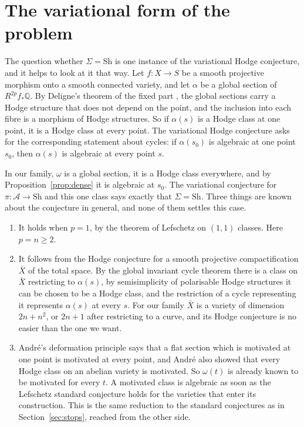 \documentclass[11pt]{amsart}
\theoremstyle{definition}
\theoremstyle{remark}
\newcommand{\QQ}{\mathbb{Q}}
\newcommand{\Sh}{\mathrm{Sh}}
\begin{document}
\section{The variational form of the problem}\label{sec:vhc}

The question whether $\Sigma=\Sh$ is one instance of the variational Hodge
conjecture, and it helps to look at it that way. Let $f\colon X\to S$ be a
smooth projective morphism onto a smooth connected variety, and let
$\alpha$ be a global section of $R^{2p}f_{*}\QQ$. By Deligne's theorem of the
fixed part \cite{Del71}, the global sections carry a Hodge structure that
does not depend on the point, and the inclusion into each fibre is a
morphism of Hodge structures. So if $\alpha(s)$ is a Hodge class at one
point, it is a Hodge class at every point. The variational Hodge conjecture
asks for the corresponding statement about cycles: if $\alpha(s_{0})$ is
algebraic at one point $s_{0}$, then $\alpha(s)$ is algebraic at every
point $s$.

In our family, $\omega$ is a global section, it is a Hodge class
everywhere, and by Proposition~\ref{prop:dense} it is algebraic at $s_{0}$.
The variational conjecture for $\pi\colon\mathcal A\to\Sh$ and this one
class says exactly that $\Sigma=\Sh$. Three things are known about the
conjecture in general, and none of them settles this case.
\begin{enumerate}[label=(\alph*)]
\item It holds when $p=1$, by the theorem of Lefschetz on $(1,1)$ classes.
Here $p=n\ge2$.
\item It follows from the Hodge conjecture for a smooth projective
compactification $\bar X$ of the total space. By the global invariant cycle
theorem \cite{Del71} there is a class on $\bar X$ restricting to
$\alpha(s)$, by semisimplicity of polarisable Hodge structures it can be
chosen to be a Hodge class, and the restriction of a cycle representing it
represents $\alpha(s)$ at every $s$. For our family $\bar X$ is a variety
of dimension $2n+n^{2}$, or $2n+1$ after restricting to a curve, and its
Hodge conjecture is no easier than the one we want.
\item Andr\'e's deformation principle \cite{And96} says that a flat section
which is motivated at one point is motivated at every point, and Andr\'e
also showed that every Hodge class on an abelian variety is motivated. So
$\omega(t)$ is already known to be motivated for every $t$. A motivated
class is algebraic as soon as the Lefschetz standard conjecture holds for
the varieties that enter its construction. This is the same reduction to
the standard conjectures as in Section~\ref{sec:stops}, reached from the
other side.
\end{enumerate}
\end{document}
